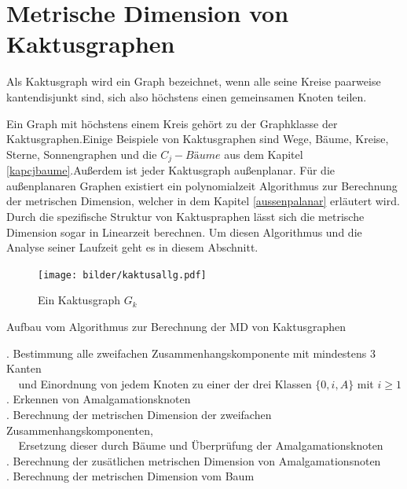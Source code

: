 \chapter{Metrische Dimension von Kaktusgraphen}
\label{kapkaktus}
\begin{defi}
Als Kaktusgraph wird ein Graph bezeichnet, wenn alle seine Kreise paarweise kantendisjunkt sind, sich also höchstens einen gemeinsamen Knoten teilen.
\end{defi}
Ein Graph mit höchstens einem Kreis gehört zu der Graphklasse der Kaktusgraphen.\newline Einige Beispiele von Kaktusgraphen sind Wege, Bäume, Kreise, Sterne, Sonnengraphen und die $C_j-Bäume$ aus dem Kapitel \ref{kapcjbaume}.\newline Außerdem ist jeder Kaktusgraph außenplanar. Für die außenplanaren Graphen existiert ein polynomialzeit Algorithmus zur Berechnung der metrischen Dimension, welcher in dem Kapitel \ref{aussenpalanar} erläutert wird. Durch die spezifische Struktur von Kaktuspraphen lässt sich die metrische Dimension sogar in Linearzeit berechnen. Um diesen Algorithmus und die Analyse seiner Laufzeit geht es in diesem Abschnitt.
\begin{figure}[h!]
		\centering
 		 \texttt{[image: bilder/kaktusallg.pdf]}
   \caption{Ein Kaktusgraph $G_k$}
   \label{gk}
  	 \end{figure}
  	 \vspace{-2mm}
\begin{algorithm}
\caption{Aufbau vom Algorithmus zur Berechnung der MD von Kaktusgraphen}
\begin{algorithmic}
\vspace{2mm}
\vspace{2mm}
\vspace{2mm}
. Bestimmung alle zweifachen Zusammenhangskomponente mit mindestens 3 Kanten\\$\;\;\;\;$und Einordnung von jedem Knoten zu einer der drei Klassen $\{0,i,A\}$ mit $i \geq 1$\\
\vspace{2mm}
. Erkennen von Amalgamationsknoten\\
\vspace{2mm}
. Berechnung der metrischen Dimension der zweifachen Zusammenhangskomponenten,\\$\;\;\;\;$Ersetzung dieser durch Bäume und Überprüfung der Amalgamationsknoten\\
\vspace{2mm}
. Berechnung der zusätlichen metrischen Dimension von Amalgamationsnoten\\
\vspace{2mm}
. Berechnung der metrischen Dimension vom Baum
\vspace{2mm}
\end{algorithmic}
\end{algorithm}
\newpage
